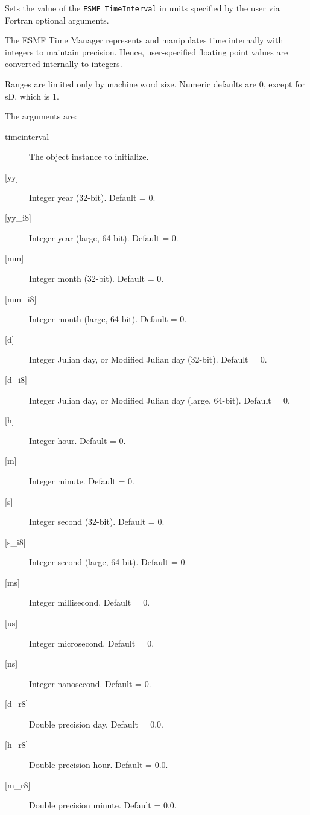        Sets the value of the {\tt ESMF\_TimeInterval} in units specified by
       the user via Fortran optional arguments.
  
       The ESMF Time Manager represents and manipulates time internally with
       integers to maintain precision.  Hence, user-specified floating point
       values are converted internally to integers.
  
       Ranges are limited only by machine word size.  Numeric defaults are 0,
       except for sD, which is 1.
  
       The arguments are:
       \begin{description}
       \item[timeinterval]
            The object instance to initialize.
       \item[{[yy]}]
            Integer year (32-bit).  Default = 0.
       \item[{[yy\_i8]}]
            Integer year (large, 64-bit).  Default = 0.
       \item[{[mm]}]
            Integer month (32-bit).  Default = 0.
       \item[{[mm\_i8]}]
            Integer month (large, 64-bit).  Default = 0.
       \item[{[d]}]
            Integer Julian day, or Modified Julian day (32-bit).  Default = 0.
       \item[{[d\_i8]}]
            Integer Julian day, or Modified Julian day (large, 64-bit).
            Default = 0.
       \item[{[h]}]
            Integer hour.  Default = 0.
       \item[{[m]}]
            Integer minute.  Default = 0.
       \item[{[s]}]
            Integer second (32-bit).  Default = 0.
       \item[{[s\_i8]}]
            Integer second (large, 64-bit).  Default = 0.
       \item[{[ms]}]
            Integer millisecond.  Default = 0.
       \item[{[us]}]
            Integer microsecond.  Default = 0.
       \item[{[ns]}]
            Integer nanosecond.  Default = 0.
       \item[{[d\_r8]}]
            Double precision day.  Default = 0.0.
       \item[{[h\_r8]}]
            Double precision hour.  Default = 0.0.
       \item[{[m\_r8]}]
            Double precision minute.  Default = 0.0.

\end{description}
